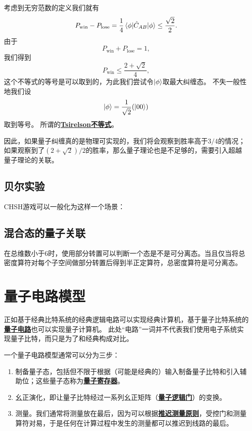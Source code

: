 \documentclass[hyperref, UTF8, a4paper]{ctexart}
\newcommand*{\concept}[1]{\underline{\textbf{#1}}}
\begin{document}
考虑到无穷范数的定义我们就有
\[
    P_\text{win} - P_\text{lose} = \frac{1}{4} \mel{\phi}{\hat{C}_{AB}}{\phi} \leq \frac{\sqrt{2}}{2}.
\]
由于
\[
    P_\text{win} + P_\text{lose} = 1,
\]
我们得到
\begin{equation}
    P_\text{win} \leq \frac{2 + \sqrt{2}}{4},
\end{equation}
这个不等式的等号是可以取到的，为此我们尝试令$\ket{\phi}$取最大纠缠态。
不失一般性地我们设
\[
    \ket{\phi} = \frac{1}{\sqrt{2}} (\ket{00} )
\]
取到等号。
所谓的\concept{Tsirelson不等式}。

因此，如果量子纠缠真的是物理可实现的，我们将会观察到胜率高于$3/4$的情况；如果观察到了$(2+\sqrt{2})/2$的胜率，那么量子理论也是不足够的，需要引入超越量子理论的关联。

\subsection{贝尔实验}

CHSH游戏可以一般化为这样一个场景：

\subsection{混合态的量子关联}

在总维数小于6时，使用部分转置可以判断一个态是不是可分离态。当且仅当将总密度算符对每个子空间做部分转置后得到半正定算符，总密度算符是可分离态。

\section{量子电路模型}

正如基于经典比特系统的经典逻辑电路可以实现经典计算机，基于量子比特系统的\concept{量子电路}也可以实现量子计算机。
此处“电路”一词并不代表我们使用电子系统实现量子比特，而只是为了和经典构成对比。

一个量子电路模型通常可以分为三步：
\begin{enumerate}
    \item 制备量子态，包括但不限于根据（可能是经典的）输入制备量子比特和引入辅助位；这些量子态称为\concept{量子寄存器}。
    \item 幺正演化，即让量子比特经过一系列幺正矩阵（\concept{量子逻辑门}）的变换。
    \item 测量。我们通常将测量放在最后，因为可以根据\concept{推迟测量原则}，受控门和测量算符对易，于是任何在计算过程中发生的测量都可以推迟到线路的最后。
\end{enumerate}
\end{document}
